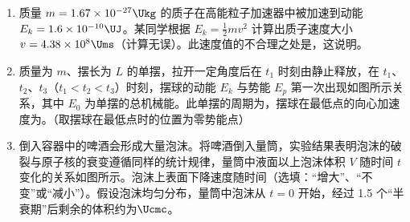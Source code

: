 \documentclass[\gkver]{gaokaozhenti}
\begin{document}
\begin{enumerate}
{$E = 3\UV$，$r_{\text{等}} = R + r = 5\UO$。

当电压表读数最大时，$R'$ 的阻值也最大，有：

$U = \frac{R'}{R' + R + r}E$

$2 = \frac{R'}{R' + 5} \times 3$

解得：$R' = 10\UO$。

（2）当 $R' = R + r = 5\UO$ 时，消耗的功率最大，为

$P_{m} = \frac{E^{2}}{4(R + r)} = \frac{3^{2}}{4 \times 5}\UW = 0.45\UW$。
}

\item
质量 $m = 1.67 \times 10^{-27}\Ukg$ 的质子在高能粒子加速器中被加速到动能 $E_{k} = 1.6 \times 10^{-10}\UJ$。某同学根据 $E_{k} = \frac{1}{2}mv^{2}$ 计算出质子速度大小 $v = 4.38 \times 10^{8}\Ums$（计算无误）。此速度值的不合理之处是，这说明。

\item
质量为 $m$、摆长为 $L$ 的单摆，拉开一定角度后在 $t_{1}$ 时刻由静止释放，在 $t_{1}$、$t_{2}$、$t_{3}$（$t_{1} < t_{2} < t_{3}$）时刻，摆球的动能 $E_{k}$ 与势能 $E_{p}$ 第一次出现如图所示关系，其中 $E_{0}$ 为单摆的总机械能。此单摆的周期为，摆球在最低点的向心加速度为。（取摆球在最低点时的位置为零势能点）
\threepicture[showlabel=false, align=right, wA=3.71cm, wB=3.97cm, wC=3.69cm]
{}
{}
{}

\item
倒入容器中的啤酒会形成大量泡沫。将啤酒倒入量筒，实验结果表明泡沫的破裂与原子核的衰变遵循同样的统计规律，量筒中液面以上泡沫体积 $V$ 随时间 $t$ 变化的关系如图所示。泡沫上表面下降速度随时间（选填：“增大”、“不变”或“减小”）。假设泡沫均匀分布，量筒中泡沫从 $t = 0$ 开始，经过 1.5 个“半衰期”后剩余的体积约为$\Ucmc$。
\onepicture[align=right, w=6.92cm]{}
\end{enumerate}
\end{document}
